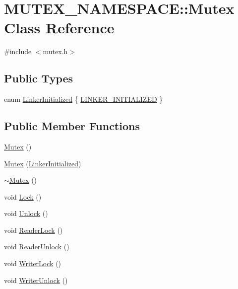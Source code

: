 \hypertarget{classMUTEX__NAMESPACE_1_1Mutex}{}\section{M\+U\+T\+E\+X\+\_\+\+N\+A\+M\+E\+S\+P\+A\+CE\+:\+:Mutex Class Reference}
\label{classMUTEX__NAMESPACE_1_1Mutex}


{\ttfamily \#include $<$mutex.\+h$>$}

\subsection*{Public Types}
\begin{DoxyCompactItemize}
\item 
enum \hyperlink{classMUTEX__NAMESPACE_1_1Mutex_adc86cefc61118aec82af3bc8bb90e0c0}{Linker\+Initialized} \{ \hyperlink{classMUTEX__NAMESPACE_1_1Mutex_adc86cefc61118aec82af3bc8bb90e0c0a1e3df83eb608cf9744b540a9f395c9ea}{L\+I\+N\+K\+E\+R\+\_\+\+I\+N\+I\+T\+I\+A\+L\+I\+Z\+ED}
 \}
\end{DoxyCompactItemize}
\subsection*{Public Member Functions}
\begin{DoxyCompactItemize}
\item 
\hyperlink{classMUTEX__NAMESPACE_1_1Mutex_a87bdc59b403697dca13cc4d7e6974897}{Mutex} ()
\item 
\hyperlink{classMUTEX__NAMESPACE_1_1Mutex_a28876311c986326e09705075fe425681}{Mutex} (\hyperlink{classMUTEX__NAMESPACE_1_1Mutex_adc86cefc61118aec82af3bc8bb90e0c0}{Linker\+Initialized})
\item 
\hyperlink{classMUTEX__NAMESPACE_1_1Mutex_a70c8725a5b4241215ea90174990deda0}{$\sim$\+Mutex} ()
\item 
void \hyperlink{classMUTEX__NAMESPACE_1_1Mutex_a0bf14b5dcd3d7f5f5b526c18792b1737}{Lock} ()
\item 
void \hyperlink{classMUTEX__NAMESPACE_1_1Mutex_a10c6e61df4a205e3693429b4d285fbab}{Unlock} ()
\item 
void \hyperlink{classMUTEX__NAMESPACE_1_1Mutex_a90b6daa95b7f0457d5f2b6003d31d48a}{Reader\+Lock} ()
\item 
void \hyperlink{classMUTEX__NAMESPACE_1_1Mutex_a793db8b25b595af5a81084b09b08955d}{Reader\+Unlock} ()
\item 
void \hyperlink{classMUTEX__NAMESPACE_1_1Mutex_ab6100d175d29d05343e252caa2e48e39}{Writer\+Lock} ()
\item 
void \hyperlink{classMUTEX__NAMESPACE_1_1Mutex_a4cb60398bf6ab0ffdab9bcd27c5c705c}{Writer\+Unlock} ()
\end{DoxyCompactItemize}


